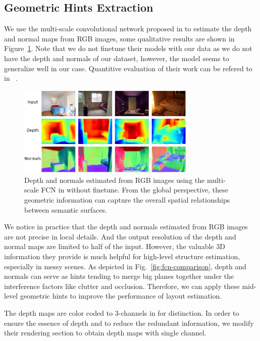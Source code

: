 \subsection{Geometric Hints Extraction}
\label{sec:depth_normal}

We use the multi-scale convolutional network proposed in \cite{eigen2015predicting} to estimate the depth and normal maps from RGB images, some qualitative results are shown in Figure~\ref{fig:depthandnormal}. Note that we do not finetune their models with our data as we do not have the depth and normals of our dataset, however, the model seems to generalize well in our case. Quantitive evaluation of their work can be refered to in ~\cite{eigen2015predicting}.
%

\begin{figure}
	\centering
	\includegraphics[width=8.5cm]{figure/extractDN.png}
	\caption{Depth and normals estimated from RGB images using the multi-scale FCN in \cite{eigen2015predicting} without finetune. From the global perspective, these geometric information can capture the overall spatial relationships between semantic surfaces. }
	\label{fig:depthandnormal}
\end{figure}

We notice in practice that the depth and normals estimated from RGB images are not precise in local details. And the output resolution of the depth and normal maps are limited to half of the input. However, the valuable 3D information they provide is much helpful for high-level structure estimation, especially in messy scenes.  
%
As depicted in Fig.~\ref{fig:fcn-comparison}, depth and normals can serve as hints tending to merge big planes together under the interference factors like clutter and occlusion. 
%
Therefore, we can apply these mid-level geometric hints to improve the performance of layout estimation. 
%


The depth maps are color coded to 3-channels in \cite{eigen2015predicting} for distinction. In order to ensure the essence of depth and to reduce the redundant information, we modify their rendering section to obtain depth maps with single channel.

